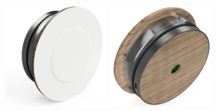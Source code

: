 \begin{figure}[htbp]
    \centering
    \includegraphics[width=170]{kapitoly/obrazky/E4/predni_render.png}
    \includegraphics[width=170]{kapitoly/obrazky/E4/zadni_render.png}
    \label{fig:M1}
\end{figure}

